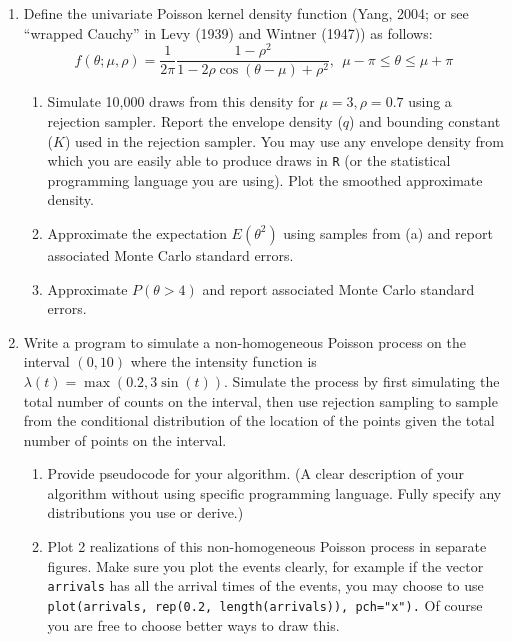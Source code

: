 \documentclass{article}
\begin{document}
\begin{enumerate}
\item Define the univariate Poisson kernel density function (Yang, 2004;
or see ``wrapped Cauchy'' in Levy (1939) and Wintner (1947)) as
follows:
\begin{equation*}
  f(\theta;\mu,\rho) = \frac{1}{2\pi} \frac{1-\rho^2}{1-2\rho \cos(\theta-\mu) + \rho^2},\:\: \mu-\pi \leq \theta \leq \mu + \pi
\end{equation*}
\begin{enumerate}
\item Simulate 10,000 draws from this density for $\mu=3, \rho=0.7$
  using a rejection sampler. Report the envelope density ($q$) and
  bounding constant ($K$) used in the rejection sampler. You may use
  any envelope density from which you are easily able to produce draws
  in {\tt R} (or the statistical programming language you are
  using). Plot the smoothed approximate density.
\item Approximate the expectation $E(\theta^2)$ using samples from (a)
  and report associated Monte Carlo standard errors.
\item Approximate $P(\theta > 4)$ and report associated Monte Carlo
standard errors.
\end{enumerate}

\item Write a program to simulate a non-homogeneous Poisson process on
  the interval $(0,10)$ where the intensity function is
  $\lambda(t)=\max(0.2,  3\sin(t))$. Simulate the process by first simulating the total number of
  counts on the interval, then use rejection sampling to sample from
  the conditional distribution of the location of the points given the
  total number of points on the interval.
\begin{enumerate}
\item Provide pseudocode for your algorithm. (A clear description of your algorithm without using specific programming language. Fully specify any distributions you use or derive.) 
\item Plot 2 realizations of this non-homogeneous Poisson process in
  separate figures. Make sure you plot the events clearly, for example
  if the vector {\tt arrivals} has all the arrival times of the
  events,  you may choose to use {\tt plot(arrivals, rep(0.2,
    length(arrivals)),    pch="x").} Of course you are free to choose better ways to draw this. 
\end{enumerate}


\end{enumerate}
\end{document}
